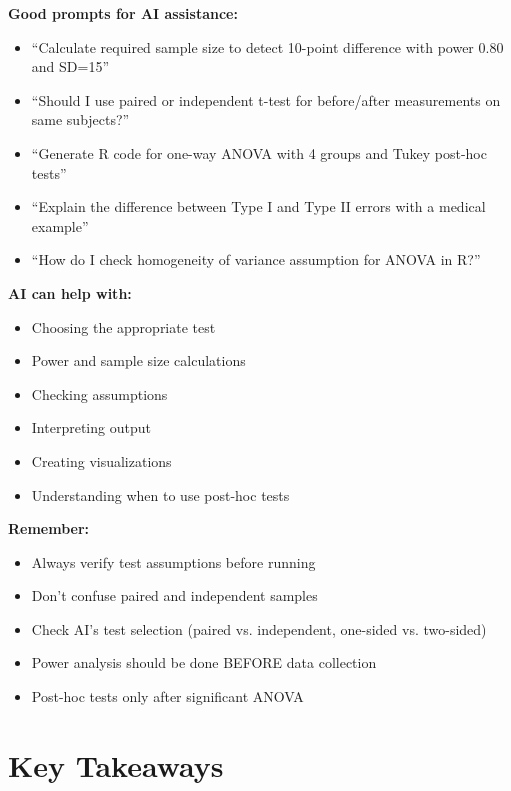 \documentclass[11pt]{article}
\begin{document}
\begin{tcolorbox}[colback=aiblue!10,colframe=aiblue,title=Using AI Tools for Hypothesis Testing]

\textbf{Good prompts for AI assistance:}
\begin{itemize}
\item ``Calculate required sample size to detect 10-point difference with power 0.80 and SD=15''
\item ``Should I use paired or independent t-test for before/after measurements on same subjects?''
\item ``Generate R code for one-way ANOVA with 4 groups and Tukey post-hoc tests''
\item ``Explain the difference between Type I and Type II errors with a medical example''
\item ``How do I check homogeneity of variance assumption for ANOVA in R?''
\end{itemize}

\textbf{AI can help with:}
\begin{itemize}
\item Choosing the appropriate test
\item Power and sample size calculations
\item Checking assumptions
\item Interpreting output
\item Creating visualizations
\item Understanding when to use post-hoc tests
\end{itemize}

\textbf{Remember:}
\begin{itemize}
\item Always verify test assumptions before running
\item Don't confuse paired and independent samples
\item Check AI's test selection (paired vs. independent, one-sided vs. two-sided)
\item Power analysis should be done BEFORE data collection
\item Post-hoc tests only after significant ANOVA
\end{itemize}
\end{tcolorbox}

\section{Key Takeaways}
\end{document}

